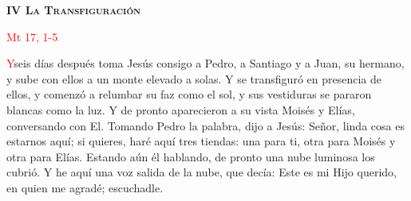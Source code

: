 \begin{center}
    \textbf{\textsc{IV La Transfiguración}}

    \textcolor{red}{Mt 17, 1-5}
\end{center}

\lettrine[lines=2]{\textcolor{red}{Y}}\space seis días después toma Jesús consigo a Pedro, a Santiago y a Juan, su hermano, y sube con ellos a un monte elevado a solas. Y se transfiguró
en presencia de ellos, y comenzó a relumbar su faz como el sol, y sus vestiduras se pararon blancas como la luz. Y de pronto aparecieron a su vista Moisés y Elías, conversando con El.
Tomando Pedro la palabra, dijo a Jesús: Señor, linda cosa es estarnos aquí; si quieres, haré aquí tres tiendas: una para ti, otra para Moisés y otra para Elías. Estando aún él hablando,
de pronto una nube luminosa los cubrió. Y he aquí una voz salida de la nube, que decía: Este es mi Hijo querido, en quien me agradé; escuchadle.